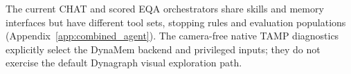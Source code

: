 The current CHAT and scored EQA orchestrators share skills and memory interfaces
but have different tool sets, stopping rules and evaluation populations
(Appendix~\ref{app:combined_agent}). The camera-free native TAMP diagnostics
explicitly select the DynaMem backend and privileged inputs; they do not exercise
the default Dynagraph visual exploration path.
